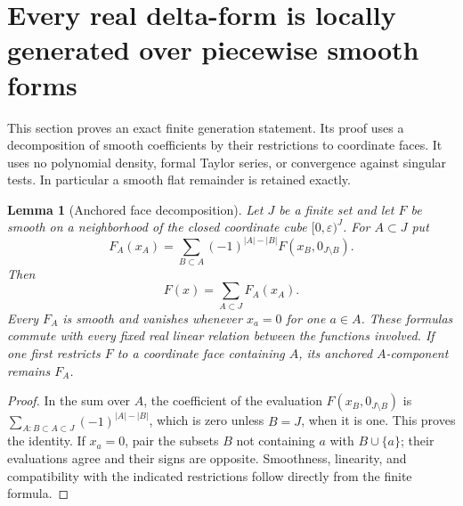 \documentclass[11pt,a4paper]{article}
\numberwithin{equation}{section}
\newtheorem{lemma}[theorem]{Lemma}
\theoremstyle{definition}
\theoremstyle{remark}
\begin{document}


\section{Every real delta-form is locally generated over piecewise smooth forms}
\label{sec:r6-delta-module-generation}

This section proves an exact finite generation statement.  Its proof
uses a decomposition of smooth coefficients by their restrictions to
coordinate faces.  It uses no polynomial density, formal Taylor series,
or convergence against singular tests.  In particular a smooth flat
remainder is retained exactly.

\begin{lemma}[Anchored face decomposition]
\label{lem:r6-anchored-face-decomposition}
Let $J$ be a finite set and let $F$ be smooth on a neighborhood of the
closed coordinate cube $[0,\varepsilon)^J$.  For $A\subset J$ put
\[
 F_A(x_A)=\sum_{B\subset A}(-1)^{|A|-|B|}F(x_B,0_{J\setminus B}).
\]
Then
\[
                         F(x)=\sum_{A\subset J}F_A(x_A).
\]
Every $F_A$ is smooth and vanishes whenever $x_a=0$ for one $a\in A$.
These formulas commute with every fixed real linear relation between
the functions involved.  If one first restricts $F$ to a coordinate
face containing $A$, its anchored $A$-component remains $F_A$.
\end{lemma}

\begin{proof}
In the sum over $A$, the coefficient of the evaluation
$F(x_B,0_{J\setminus B})$ is
$\sum_{A:B\subset A\subset J}(-1)^{|A|-|B|}$, which is zero unless
$B=J$, when it is one.  This proves the identity.  If $x_a=0$,
pair the subsets $B$ not containing $a$ with $B\cup\{a\}$;
their evaluations agree and their signs are opposite.  Smoothness,
linearity, and compatibility with the indicated restrictions follow
directly from the finite formula.
\end{proof}
\end{document}
